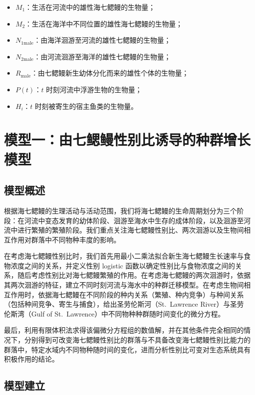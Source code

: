\documentclass[11pt,a4paper]{ctexart}
\begin{document}
\begin{itemize}
\item $M_1$：生活在河流中的雄性海七鳃鳗的生物量；
\item $M_2$：生活在海洋中不同位置的雄性海七鳃鳗的生物量；
\item $N_{1\mathrm{male}}$：由海洋洄游至河流的雄性七鳃鳗的生物量；
\item $N_{2\mathrm{male}}$：由河流洄游至海洋的雄性七鳃鳗的生物量；
\item $R_{\mathrm{male}}$：由七鳃鳗新生幼体分化而来的雄性个体的生物量；
\item $P(t)$：$t$ 时刻河流中浮游生物的生物量；
\item $H_i$：$t$ 时刻被寄生的宿主鱼类的生物量。
\end{itemize}

\section{模型一：由七鳃鳗性别比诱导的种群增长模型}

\subsection{模型概述}

根据海七鳃鳗的生理活动与活动范围，我们将海七鳃鳗的生命周期划分为三个阶段：在河流中变态发育的幼体阶段、洄游至海水中生存的成体阶段，以及洄游至河流中进行繁殖的繁殖阶段。我们重点关注海七鳃鳗性别比、两次洄游以及生物间相互作用对群落中不同物种丰度的影响。

在考虑海七鳃鳗性别比时，我们首先用最小二乘法拟合新生海七鳃鳗生长速率与食物浓度之间的关系，并定义性别 logistic 函数以确定性别比与食物浓度之间的关系，随后考虑性别比对海七鳃鳗繁殖的作用。在考虑海七鳃鳗的两次洄游时，依据其两次洄游的特征，建立不同时刻河流与海水中的种群迁移模型。在考虑生物间相互作用时，依据海七鳃鳗在不同阶段的种内关系（繁殖、种内竞争）与种间关系（包括种间竞争、寄生与捕食），给出圣劳伦斯河（St.\ Lawrence River）与圣劳伦斯湾（Gulf of St.\ Lawrence）中不同物种种群随时间变化的微分方程。

最后，利用有限体积法求得该偏微分方程组的数值解，并在其他条件完全相同的情况下，分别得到可改变海七鳃鳗性别比的群落与不具备改变海七鳃鳗性别比能力的群落中，特定水域内不同物种随时间的变化，进而分析性别比可变对生态系统具有积极作用的结论。

\subsection{模型建立}
\end{document}
